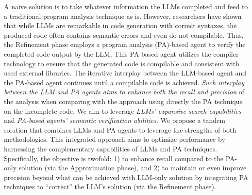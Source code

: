 
A naive solution is to take whatever information the LLMs completed
and feed to a traditional program analysis technique as is. However,
researchers have shown that while LLMs are remarkable in code
generation with correct syntaxes, the produced code often contains
semantic errors and even do not compilable.  Thus, the Refinement
phase employs a program analysis (PA)-based agent to verify the
completed code output by the LLM. This PA-based agent utilizes the
compiler technology to ensure that the generated code is compilable
and consistent with used external libraries.  The iterative interplay
between the LLM-based agent and the PA-based agent continues until a
compilable code is achieved.
{\em Such interplay between the LLM and PA agents aims to enhance both the
recall and precision} of the analysis when comparing with the approach
using directly the PA technique on the incomplete code. We aim to
leverage {\em LLMs' expansive search capabilities} and {\em PA-based
  agents' semantic verification abilities}.
We propose a tandem solution that combines LLMs and PA agents to
leverage the strengths of both methodologies. This integrated approach
aims to optimize performance by harnessing the complementary
capabilities of LLMs and PA techniques. Specifically, the objective is
twofold: 1) to enhance recall compared to the PA-only solution (via
the Approximation phase), and 2) to maintain or even improve precision
beyond what can be achieved with LLM-only solution by integrating PA
techniques to ``correct'' the LLM's solution (via the Refinement
phase).


